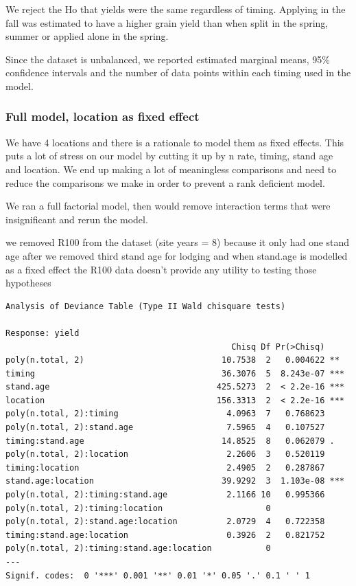 \documentclass[
  letterpaper,
  DIV=11,
  numbers=noendperiod]{scrartcl}
\begin{document}
We reject the Ho that yields were the same regardless of timing.
Applying in the fall was estimated to have a higher grain yield than
when split in the spring, summer or applied alone in the spring.

Since the dataset is unbalanced, we reported estimated marginal means,
95\% confidence intervals and the number of data points within each
timing used in the model.

\hypertarget{full-model-location-as-fixed-effect}{%
\subsubsection{Full model, location as fixed
effect}\label{full-model-location-as-fixed-effect}}

We have 4 locations and there is a rationale to model them as fixed
effects. This puts a lot of stress on our model by cutting it up by n
rate, timing, stand age and location. We end up making a lot of
meaningless comparisons and need to reduce the comparisons we make in
order to prevent a rank deficient model.

We ran a full factorial model, then would remove interaction terms that
were insignificant and rerun the model.

we removed R100 from the dataset (site years = 8) because it only had
one stand age after we removed third stand age for lodging and when
stand.age is modelled as a fixed effect the R100 data doesn't provide
any utility to testing those hypotheses

\begin{verbatim}
Analysis of Deviance Table (Type II Wald chisquare tests)

Response: yield
                                              Chisq Df Pr(>Chisq)    
poly(n.total, 2)                            10.7538  2   0.004622 ** 
timing                                      36.3076  5  8.243e-07 ***
stand.age                                  425.5273  2  < 2.2e-16 ***
location                                   156.3313  2  < 2.2e-16 ***
poly(n.total, 2):timing                      4.0963  7   0.768623    
poly(n.total, 2):stand.age                   7.5965  4   0.107527    
timing:stand.age                            14.8525  8   0.062079 .  
poly(n.total, 2):location                    2.2606  3   0.520119    
timing:location                              2.4905  2   0.287867    
stand.age:location                          39.9292  3  1.103e-08 ***
poly(n.total, 2):timing:stand.age            2.1166 10   0.995366    
poly(n.total, 2):timing:location                     0               
poly(n.total, 2):stand.age:location          2.0729  4   0.722358    
timing:stand.age:location                    0.3926  2   0.821752    
poly(n.total, 2):timing:stand.age:location           0               
---
Signif. codes:  0 '***' 0.001 '**' 0.01 '*' 0.05 '.' 0.1 ' ' 1
\end{verbatim}
\end{document}
